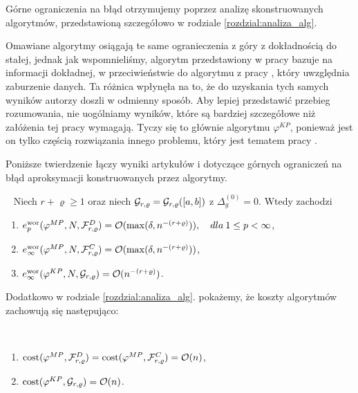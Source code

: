\documentclass[oik, pdftex, man]{mgrwms}
\begin{document}
    Górne ograniczenia na błąd otrzymujemy poprzez analizę skonstruowanych algorytmów, przedstawioną szczegółowo w rodziale \ref{rozdzial:analiza_alg}.
    
    Omawiane algorytmy osiągają te same ogranieczenia z góry z dokładnością do stałej, jednak jak wspomnieliśmy, algorytm przedstawiony w pracy \cite{CoDF} bazuje na informacji dokładnej, w przeciwieństwie do algorytmu z pracy \cite{AoP}, który uwzględnia zaburzenie danych. Ta różnica wpłynęła na to, że do uzyskania tych samych wyników autorzy doszli w odmienny sposób. Aby lepiej przedstawić przebieg rozumowania, nie uogólniamy wyników, które są bardziej szczegółowe niż załóżenia tej pracy wymagają. Tyczy się to głównie algorytmu $\varphi^{KP}$, ponieważ jest on tylko częścią rozwiązania innego problemu, który jest tematem pracy \cite{CoDF}.

    Poniższe twierdzenie łączy wyniki artykułów \cite{CoDF} i \cite{AoP} dotyczące górnych ograniczeń na błąd aproksymacji konstruowanych przez algorytmy.
    
    \begin{thm} \label{thm:1:ograniczenia_z_gory}~%
        Niech $r+\varrho \geq 1$ oraz niech $\mathcal{G}_{r,\varrho} = \mathcal{G}_{r,\varrho}([a,b])$ z $\Delta_{g}^{(0)} = 0$. Wtedy zachodzi
        \begin{enumerate}[label=(\roman*)]
            \item \label{thm:1:i}$e_{p}^{\mathrm{wor}}(\varphi^{MP},N,\mathcal{F}_{r,\varrho}^{D}) = \mathcal{O}(\max(\delta, n^{-(r+\varrho)})), \quad dla \: 1 \leq p < \infty$,
            \item \label{thm:1:ii}$e_{\infty}^{\mathrm{wor}}(\varphi^{MP},N,\mathcal{F}_{r,\varrho}^{C}) = \mathcal{O}(\max(\delta, n^{-(r+\varrho)}))$,
            \item \label{thm:1:iii}$e_{\infty}^{\mathrm{wor}}(\varphi^{KP},N,\mathcal{G}_{r,\varrho}) = \mathcal{O}(n^{-(r+\varrho)})$.
        \end{enumerate}
    \end{thm}
    
    \newpage

    Dodatkowo w rodziale \ref{rozdzial:analiza_alg}. pokażemy, że koszty algorytmów zachowują się następująco:

    \begin{stw}~%
        \begin{enumerate}
            \item $\mathrm{cost}(\varphi^{MP}, \mathcal{F}_{r,\varrho}^{D}) = \mathrm{cost}(\varphi^{MP}, \mathcal{F}_{r,\varrho}^{C}) = \mathcal{O}(n)$,
            \item $\mathrm{cost}(\varphi^{KP}, \mathcal{G}_{r,\varrho}) = \mathcal{O}(n)$.
        \end{enumerate}
    \end{stw}
\end{document}
